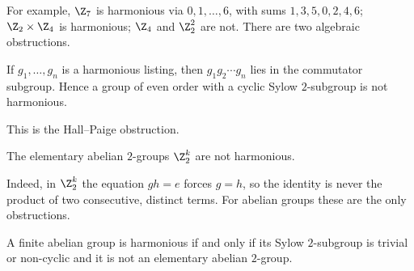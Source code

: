 For example, $\Z_7$ is harmonious via $0,1,\dots,6$, with sums $1,3,5,0,2,4,6$; $\Z_2\times\Z_4$ is harmonious; $\Z_4$ and $\Z_2^2$ are not. There are two algebraic obstructions.

\begin{theorem}\label{thm:harm-paige}
If $g_1,\dots,g_n$ is a harmonious listing, then $g_1g_2\cdots g_n$ lies in the commutator subgroup. Hence a group of even order with a cyclic Sylow $2$-subgroup is not harmonious.
\end{theorem}

This is the Hall--Paige obstruction.

\begin{theorem}\label{thm:harm-z2k}
The elementary abelian $2$-groups $\Z_2^k$ are not harmonious.
\end{theorem}

Indeed, in $\Z_2^k$ the equation $gh=e$ forces $g=h$, so the identity is never the product of two consecutive, distinct terms. For abelian groups these are the only obstructions.

\begin{theorem}\label{thm:harm-abelian}
A finite abelian group is harmonious if and only if its Sylow $2$-subgroup is trivial or non-cyclic and it is not an elementary abelian $2$-group.
\end{theorem}
